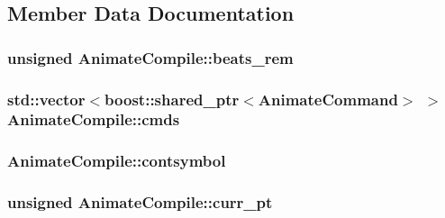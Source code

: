 \subsection{Member Data Documentation}
\hypertarget{a00007_af3feb682c6ad3aab1c7483d6b3dcd5f0}{
\subsubsection[{beats\-\_\-rem}]{\setlength{\rightskip}{0pt plus 5cm}unsigned Animate\-Compile\-::beats\-\_\-rem\hspace{0.3cm}{\ttfamily [private]}}}\label{a00007_af3feb682c6ad3aab1c7483d6b3dcd5f0}
\hypertarget{a00007_a5d5b0775236c5ad6382eb58f1e0fc0a9}{
\subsubsection[{cmds}]{\setlength{\rightskip}{0pt plus 5cm}std\-::vector$<$boost\-::shared\-\_\-ptr$<${\bf Animate\-Command}$>$ $>$ Animate\-Compile\-::cmds\hspace{0.3cm}{\ttfamily [private]}}}\label{a00007_a5d5b0775236c5ad6382eb58f1e0fc0a9}
\hypertarget{a00007_aa854b256cdb3fcc21d3a7b110f34bc20}{
\subsubsection[{contsymbol}]{ Animate\-Compile\-::contsymbol\hspace{0.3cm}{\ttfamily [private]}}}\label{a00007_aa854b256cdb3fcc21d3a7b110f34bc20}
\hypertarget{a00007_a88dedadc61cd7a2dcc08140809e81e0b}{
\subsubsection[{curr\-\_\-pt}]{\setlength{\rightskip}{0pt plus 5cm}unsigned Animate\-Compile\-::curr\-\_\-pt\hspace{0.3cm}{\ttfamily [private]}}}\label{a00007_a88dedadc61cd7a2dcc08140809e81e0b}
